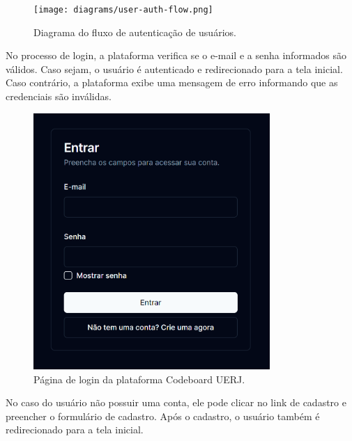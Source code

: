 \begin{figure}[H]
    \centering
    \texttt{[image: diagrams/user-auth-flow.png]}
    \caption{Diagrama do fluxo de autenticação de usuários.}
    \label{fig:user-auth-flow}
\end{figure}

No processo de login, a plataforma verifica se o e-mail e a senha informados são válidos. Caso sejam, o usuário é autenticado e redirecionado para a tela inicial. Caso contrário, a plataforma exibe uma mensagem de erro informando que as credenciais são inválidas.

\begin{figure}[H]
    \centering
    \includegraphics[width=0.8\textwidth]{assets/codeboard/login-page.png}
    \caption{Página de login da plataforma Codeboard UERJ.}
    \label{fig:login-page}
\end{figure}

No caso do usuário não possuir uma conta, ele pode clicar no link de cadastro e preencher o formulário de cadastro. Após o cadastro, o  usuário também é redirecionado para a tela inicial.

